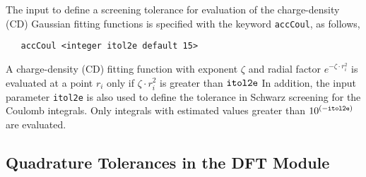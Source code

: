 The input to define a screening tolerance for evaluation of the
charge-density (CD) Gaussian fitting functions is specified with the
keyword \verb+accCoul+, as follows,

\begin{verbatim}
   accCoul <integer itol2e default 15>
\end{verbatim}

A  charge-density (CD) fitting function with exponent $\zeta$
and radial factor $e^{-\zeta\cdot r_i^2}$ is evaluated  at a 
point $r_i$ only if $\zeta\cdot r_i^2$ is greater than ${\tt itol2e}$
In addition, the input
parameter {\tt itol2e} is also used to define the tolerance  in Schwarz 
screening for the Coulomb integrals.  Only integrals with estimated
values greater than $10^{(-{\tt itol2e})}$ are evaluated.


\subsection{Quadrature Tolerances in the DFT Module}

